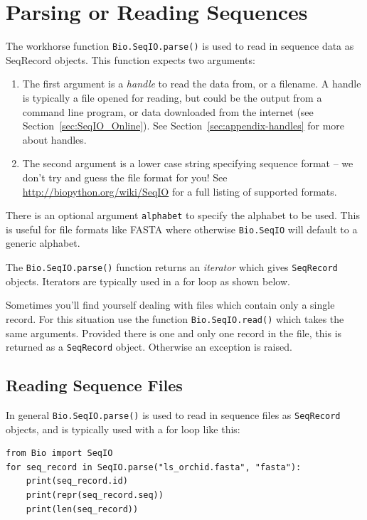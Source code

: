 \documentclass{report}
\begin{document}
\section{Parsing or Reading Sequences}
\label{sec:Bio.SeqIO-input}

The workhorse function \verb|Bio.SeqIO.parse()| is used to read in sequence data as SeqRecord objects.  This function expects two arguments:

\begin{enumerate}
\item The first argument is a {\it handle} to read the data from, or a filename. A handle is typically a file opened for reading, but could be the output from a command line program, or data downloaded from the internet (see Section~\ref{sec:SeqIO_Online}).  See Section~\ref{sec:appendix-handles} for more about handles.
\item The second argument is a lower case string specifying sequence format -- we don't try and guess the file format for you!  See \url{http://biopython.org/wiki/SeqIO} for a full listing of supported formats.
\end{enumerate}

\noindent There is an optional argument \verb|alphabet| to specify the alphabet to be used.  This is useful for file formats like FASTA where otherwise \verb|Bio.SeqIO| will default to a generic alphabet.

The \verb|Bio.SeqIO.parse()| function returns an {\it iterator} which gives \verb|SeqRecord| objects.  Iterators are typically used in a for loop as shown below.

Sometimes you'll find yourself dealing with files which contain only a single record.  For this situation use the function \verb|Bio.SeqIO.read()| which takes the same arguments.  Provided there is one and only one record in the file, this is returned as a \verb|SeqRecord| object.  Otherwise an exception is raised.

\subsection{Reading Sequence Files}

In general \verb|Bio.SeqIO.parse()| is used to read in sequence files as \verb|SeqRecord| objects, and is typically used with a for loop like this:

\begin{verbatim}
from Bio import SeqIO
for seq_record in SeqIO.parse("ls_orchid.fasta", "fasta"):
    print(seq_record.id)
    print(repr(seq_record.seq))
    print(len(seq_record))
\end{verbatim}
\end{document}

